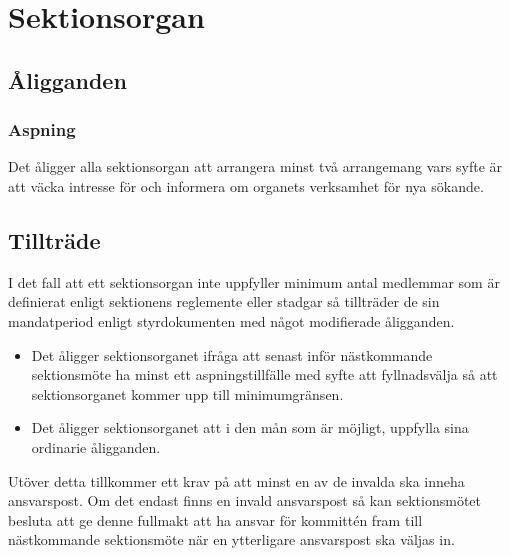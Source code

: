 \section{Sektionsorgan}

\subsection{Åligganden}

\subsubsection{Aspning}
Det åligger alla sektionsorgan att arrangera minst två arrangemang vars syfte är att väcka intresse för och informera om organets verksamhet för nya sökande.

\subsection{Tillträde}
I det fall att ett sektionsorgan inte uppfyller minimum antal medlemmar som är definierat enligt sektionens reglemente eller stadgar så tillträder de sin mandatperiod
enligt styrdokumenten med något modifierade åligganden.
\begin{itemize}
    \item Det åligger sektionsorganet ifråga att senast inför nästkommande sektionsmöte ha minst ett aspningstillfälle med syfte att fyllnadsvälja så att sektionsorganet kommer upp till minimumgränsen.
    \item Det åligger sektionsorganet att i den mån som är möjligt, uppfylla sina ordinarie åligganden.
\end{itemize}
Utöver detta tillkommer ett krav på att minst en av de invalda ska inneha ansvarspost. 
Om det endast finns en invald ansvarspost så kan sektionsmötet besluta att ge denne fullmakt att ha ansvar för kommittén fram till nästkommande sektionsmöte när en ytterligare ansvarspost ska väljas in.